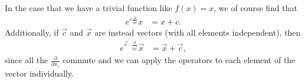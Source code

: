In the case that we have a trivial function like $f(x) = x$, we of course find that
\begin{align}
	e^{c \frac{\partial}{\partial x}} x
	&= x + c.
\end{align}
Additionally, if $\vec{c}$ and $\vec{x}$ are instead vectors (with all elements independent), then
\begin{align}
	e^{\vec{c} \cdot \frac{\partial}{\partial \vec{x}}} \vec{x}
	&= \vec{x} + \vec{c},
		\label{eq:exp-deriv}
\end{align}
since all the $\frac{\partial}{\partial x_i}$ commute and we can apply the operators to each element of the vector individually.
